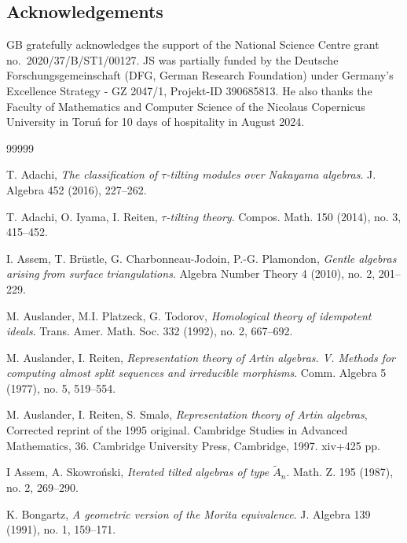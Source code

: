 \documentclass[12pt,reqno]{amsart}
\theoremstyle{definition}
\begin{document}
\bigskip
\subsection*{Acknowledgements}
GB gratefully acknowledges the support of the National Science Centre grant no.\ 2020/37/B/ST1/00127.
JS was partially funded by the Deutsche Forschungsgemeinschaft
(DFG, German Research Foundation) under Germany's Excellence Strategy - GZ 2047/1, Projekt-ID 390685813.
He also thanks the
Faculty of Mathematics and Computer Science
of the Nicolaus Copernicus University in Toru\'n for 10 days of hospitality in August 2024.



\begin{thebibliography}{99999}


T. Adachi,
\emph{The classification of $\tau$-tilting modules over Nakayama algebras}.
J. Algebra 452 (2016), 227--262.

T. Adachi, O. Iyama, I. Reiten,
\emph{$\tau$-tilting theory}.
Compos. Math. 150 (2014), no. 3, 415--452.

I. Assem, T. Br\"ustle, G. Charbonneau-Jodoin,
P.-G. Plamondon,
\emph{Gentle algebras arising from surface triangulations}.
Algebra Number Theory 4 (2010), no. 2, 201--229.

M. Auslander, M.I. Platzeck, G. Todorov,
\emph{Homological theory of idempotent ideals}.
Trans. Amer. Math. Soc. 332 (1992), no. 2, 667--692.

M. Auslander, I. Reiten,
\emph{Representation theory of Artin algebras. V. Methods for computing almost split sequences and irreducible morphisms}.
Comm. Algebra 5 (1977), no. 5, 519--554.

M. Auslander, I. Reiten, S. Smal\o,
\emph{Representation theory of Artin algebras},
Corrected reprint of the 1995 original. Cambridge Studies in Advanced Mathematics, 36. Cambridge University Press, Cambridge, 1997.
xiv+425 pp.

I Assem, A. Skowro\'nski,
\emph{Iterated tilted algebras of type $\widetilde{A}_n$}.
Math. Z. 195 (1987), no. 2, 269--290.

K. Bongartz,
\emph{A geometric version of the Morita equivalence}.
J. Algebra 139 (1991), no. 1, 159--171.


\end{thebibliography}
\end{document}
